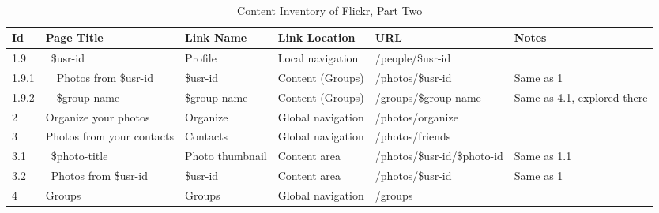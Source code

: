 \documentclass[12pt,a4paper]{article}
\begin{document}
\begin{landscape}
  \begin{table}[h!b!p!]
    \caption{Content Inventory of Flickr, Part Two}
    \label{table:content.inventory.flickr.2}
    \begin{center}
      \begin{tiny}
        \tt
        \begin{tabular}{l|l|l|l|l|p{3cm}}
            Id &
            Page Title &
            Link Name &
            Link Location &
            URL &
            Notes \\

            \hline

              1.9 &
              ~\$usr-id &
              Profile &
              Local navigation &
              /people/\$usr-id &
              \\

                1.9.1 &
                ~~Photos from \$usr-id &
                \$usr-id &
                Content (Groups) &
                /photos/\$usr-id &
                Same as 1 \\

                1.9.2 &
                ~~\$group-name &
                \$group-name &
                Content (Groups) &
                /groups/\$group-name &
                Same as 4.1, explored there \\

            2 &
            Organize your photos &
            Organize &
            Global navigation &
            /photos/organize &
            \\

            3 &
            Photos from your contacts &
            Contacts &
            Global navigation &
            /photos/friends &
            \\

              3.1 &
              ~\$photo-title &
              Photo thumbnail &
              Content area &
              /photos/\$usr-id/\$photo-id &
              Same as 1.1 \\

              3.2 &
              ~Photos from \$usr-id &
              \$usr-id &
              Content area &
              /photos/\$usr-id &
              Same as 1 \\

            4 &
            Groups &
            Groups &
            Global navigation &
            /groups &
            \\


\end{tabular}
\end{tiny}
\end{center}
\end{table}
\end{landscape}
\end{document}
